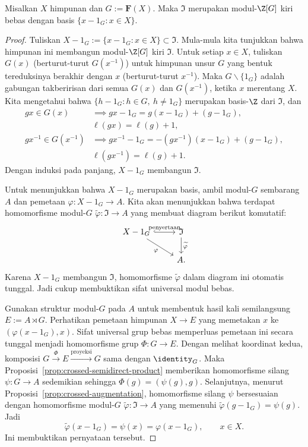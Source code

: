 \begin{lemma}\label{prop:free-group-augmentation}
	Misalkan $X$ himpunan dan $G:=\mathbf{F}(X)$. Maka $\mathfrak{I}$ merupakan
	modul-$\Z[G]$ kiri bebas dengan basis
	$\{x-1_G:x\in X\}$.
\end{lemma}
\begin{proof}
	Tuliskan
	$X-1_G:=\{x-1_G:x\in X\}\subset\mathfrak{I}$. Mula-mula kita tunjukkan
	bahwa himpunan ini membangun modul-$\Z[G]$ kiri $\mathfrak{I}$. Untuk
	setiap $x\in X$, tuliskan $G(x)$ (berturut-turut $G(x^{-1})$) untuk
	himpunan unsur $G$ yang bentuk tereduksinya berakhir dengan $x$
	(berturut-turut $x^{-1}$). Maka $G\smallsetminus\{1_G\}$ adalah gabungan
	takberirisan dari semua $G(x)$ dan $G(x^{-1})$, ketika $x$ merentang
	$X$. Kita mengetahui bahwa
	$\{h-1_G:h\in G,\ h\neq1_G\}$ merupakan basis-$\Z$ dari $\mathfrak{I}$,
	dan
	\begin{align*}
		gx\in G(x)&\implies gx-1_G=g(x-1_G)+(g-1_G),\\
		&\ell(gx)=\ell(g)+1,\\
		gx^{-1}\in G(x^{-1})&\implies
		gx^{-1}-1_G=-(gx^{-1})(x-1_G)+(g-1_G),\\
		&\ell(gx^{-1})=\ell(g)+1.
	\end{align*}
	Dengan induksi pada panjang, $X-1_G$ membangun $\mathfrak{I}$.

	Untuk menunjukkan bahwa $X-1_G$ merupakan basis, ambil modul-$G$ sembarang
	$A$ dan pemetaan $\varphi:X-1_G\to A$. Kita akan menunjukkan bahwa terdapat
	homomorfisme modul-$G$ $\widetilde{\varphi}:\mathfrak{I}\to A$ yang membuat
	diagram berikut komutatif:
	\[\begin{tikzcd}
		X-1_G \arrow[hookrightarrow,r,"\text{penyertaan}"]
		\arrow[rd,"\varphi"'] & \mathfrak{I} \arrow[d,"{\widetilde{\varphi}}"]\\
		& A.
	\end{tikzcd}\]
	Karena $X-1_G$ membangun $\mathfrak{I}$, homomorfisme
	$\widetilde{\varphi}$ dalam diagram ini otomatis tunggal. Jadi cukup
	membuktikan sifat universal modul bebas.

	Gunakan struktur modul-$G$ pada $A$ untuk membentuk hasil kali
	semilangsung $E:=A\rtimes G$. Perhatikan pemetaan himpunan $X\to E$ yang
	memetakan $x$ ke $(\varphi(x-1_G),x)$. Sifat universal grup bebas memperluas
	pemetaan ini secara tunggal menjadi homomorfisme grup $\Phi:G\to E$.
	Dengan melihat koordinat kedua, komposisi
	$G\xrightarrow{\Phi}E\xrightarrow{\text{proyeksi}}G$ sama dengan
	$\identity_G$. Maka Proposisi~\ref{prop:crossed-semidirect-product}
	memberikan homomorfisme silang $\psi:G\to A$ sedemikian sehingga
	$\Phi(g)=(\psi(g),g)$. Selanjutnya, menurut
	Proposisi~\ref{prop:crossed-augmentation}, homomorfisme silang $\psi$
	bersesuaian dengan homomorfisme modul-$G$
	$\widetilde{\varphi}:\mathfrak{I}\to A$ yang memenuhi
	$\widetilde{\varphi}(g-1_G)=\psi(g)$. Jadi
	\[ \widetilde{\varphi}(x-1_G)=\psi(x)=\varphi(x-1_G),
	\qquad x\in X. \]
	Ini membuktikan pernyataan tersebut.
\end{proof}

